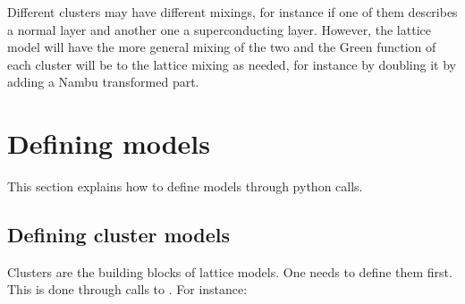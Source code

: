 \documentclass[letterpaper,10pt,english]{sphinxmanual}
\begin{document}
\sphinxAtStartPar
Different clusters may have different mixings, for instance if one of them describes a normal layer and another one a superconducting layer.
However, the lattice model will have the more general mixing of the two and the Green function of each cluster will be  to the lattice mixing as needed, for instance by doubling it by adding a Nambu transformed part.


\chapter{Defining models}
\label{\detokenize{defining_models:defining-models}}\label{\detokenize{defining_models::doc}}
\sphinxAtStartPar
This section explains how to define models through python calls.


\section{Defining cluster models}
\label{\detokenize{defining_models:defining-cluster-models}}
\sphinxAtStartPar
Clusters are the building blocks of lattice models. One needs to define them first.
This is done through calls to . For instance:

\begin{sphinxVerbatim}[commandchars=\\\{\}]
   
   \PYG{p}{[}\PYG{p}{[}   \PYG{p}{]} \PYG{p}{[}   \PYG{p}{]}\PYG{p}{]}
\end{sphinxVerbatim}
\end{document}
